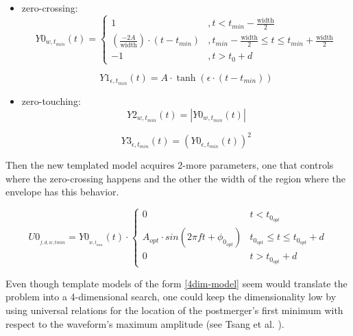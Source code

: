 \begin{itemize}
\item zero-crossing:
\begin{equation}\label{line}
Y0_{w, t_{min}}(t) =
\begin{cases} 
      1 &, t<t_{min}-\mathrm{\frac{width}{2}} \\
      \left( \frac{-2A}{\mathrm{width}} \right) \cdot (t- t_{min}) &, t_{min}-\mathrm{\frac{width}{2}} \leq t \leq t_{min}+\mathrm{\frac{width}{2}} \\
     -1 &, t>t_{0}+d
   \end{cases}
\end{equation}

\begin{equation}\label{tanh}
Y1_{\epsilon, t_{min}}(t) = A \cdot \tanh (\epsilon \cdot(t-t_{min}))
\end{equation}

\vspace{0.5cm}


\item zero-touching:
\begin{equation}\label{line-abs}
Y2_{w, t_{min}}(t) = \left| Y0_{w, t_{min}}(t) \right|
\end{equation}

\begin{equation}\label{tanh2}
Y3_{\epsilon, t_{min}}(t) = \left( Y0_{\epsilon, t_{min}}(t) \right)^2
\end{equation}

\end{itemize}

Then the new templated model acquires 2-more parameters, one that controls where the zero-crossing happens and the other the width of the region where the envelope has this behavior.

\begin{equation}\label{4dim-model}
U0_{_{f,d, w, tmin}} = Y0_{_{w,t_{min}}}(t) \cdot
\begin{cases} 
      0 & t<t_{0_{opt}} \\
      A_{opt} \cdot sin(2\pi f t + \phi_{0_{opt}}) & t_{0_{opt}} \leq t\leq t_{0_{opt}}+d \\
      0 & t>t_{0_{opt}}+d
   \end{cases}
\end{equation}


Even though template models of the form \ref{4dim-model} seem would translate the problem into a 4-dimensional search, one could keep the dimensionality low by using universal relations for the location of the postmerger's first minimum with respect to the waveform's maximum amplitude (see Tsang et al. \cite{Tsang:2019esi}). 

